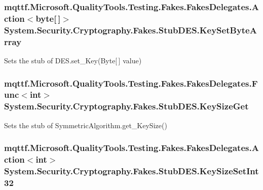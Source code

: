 \hypertarget{class_system_1_1_security_1_1_cryptography_1_1_fakes_1_1_stub_d_e_s_a9c583efa780bea2695f0ea1b11b8b038}{
\subsubsection[{Key\-Set\-Byte\-Array}]{\setlength{\rightskip}{0pt plus 5cm}mqttf.\-Microsoft.\-Quality\-Tools.\-Testing.\-Fakes.\-Fakes\-Delegates.\-Action$<$byte\mbox{[}$\,$\mbox{]}$>$ System.\-Security.\-Cryptography.\-Fakes.\-Stub\-D\-E\-S.\-Key\-Set\-Byte\-Array}}\label{class_system_1_1_security_1_1_cryptography_1_1_fakes_1_1_stub_d_e_s_a9c583efa780bea2695f0ea1b11b8b038}


Sets the stub of D\-E\-S.\-set\-\_\-\-Key(\-Byte\mbox{[}$\,$\mbox{]} value)

\hypertarget{class_system_1_1_security_1_1_cryptography_1_1_fakes_1_1_stub_d_e_s_a29107464ffe41db45f4de2e89b835184}{
\subsubsection[{Key\-Size\-Get}]{\setlength{\rightskip}{0pt plus 5cm}mqttf.\-Microsoft.\-Quality\-Tools.\-Testing.\-Fakes.\-Fakes\-Delegates.\-Func$<$int$>$ System.\-Security.\-Cryptography.\-Fakes.\-Stub\-D\-E\-S.\-Key\-Size\-Get}}\label{class_system_1_1_security_1_1_cryptography_1_1_fakes_1_1_stub_d_e_s_a29107464ffe41db45f4de2e89b835184}


Sets the stub of Symmetric\-Algorithm.\-get\-\_\-\-Key\-Size()

\hypertarget{class_system_1_1_security_1_1_cryptography_1_1_fakes_1_1_stub_d_e_s_a53e8298cba8c6bef71801a2cd62a4019}{
\subsubsection[{Key\-Size\-Set\-Int32}]{\setlength{\rightskip}{0pt plus 5cm}mqttf.\-Microsoft.\-Quality\-Tools.\-Testing.\-Fakes.\-Fakes\-Delegates.\-Action$<$int$>$ System.\-Security.\-Cryptography.\-Fakes.\-Stub\-D\-E\-S.\-Key\-Size\-Set\-Int32}}\label{class_system_1_1_security_1_1_cryptography_1_1_fakes_1_1_stub_d_e_s_a53e8298cba8c6bef71801a2cd62a4019}


